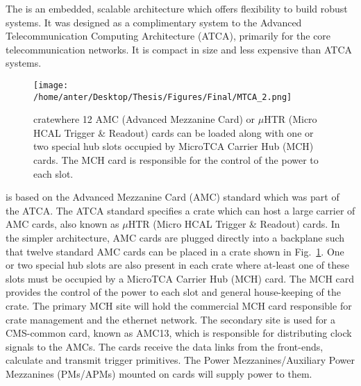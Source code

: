 The \mtca is an embedded, scalable architecture which offers flexibility to build robust systems. It was designed as a complimentary system to the Advanced Telecommunication Computing Architecture (ATCA), primarily for the core telecommunication networks. It is compact in size and less expensive than ATCA systems.\begin{figure}[!h]
\begin{center}
\vspace*{3mm}
\hspace*{-5mm}
\texttt{[image: /home/anter/Desktop/Thesis/Figures/Final/MTCA\_2.png]}\\
\vspace*{4mm}
\caption[\mtca crate showing the different slots.]{\mtca crate\footnotemark where 12 AMC (Advanced Mezzanine Card) or $\mu$HTR (Micro HCAL Trigger \& Readout) cards can be loaded along with one or two special hub slots occupied by MicroTCA Carrier Hub (MCH) cards. The MCH card is responsible for the control of the power to each slot.}
\label{fig:MTCA}
\end{center}
\end{figure} \mtca is based on the Advanced Mezzanine Card (AMC) standard which was part of the ATCA. The ATCA standard specifies a crate which can host a large carrier of AMC cards, also known as $\mu$HTR (Micro HCAL Trigger \& Readout) cards. In the simpler \mtca architecture, AMC cards are plugged directly into a backplane such that twelve standard AMC cards can be placed in a crate shown in Fig.~\ref{fig:MTCA}. One or two special hub slots are also present in each crate where at-least one of these slots must be occupied by a MicroTCA Carrier Hub (MCH) card. The MCH card provides the control of the power to each slot and general house-keeping of the crate. The primary MCH site will hold the commercial MCH card responsible for crate management and the ethernet network. The secondary site is used for a CMS-common card, known as AMC13, which is responsible for distributing clock signals to the AMCs. The \mhtr cards receive the data links from the front-ends, calculate and transmit trigger primitives. The Power Mezzanines/Auxiliary Power Mezzanines (PMs/APMs) mounted on \mhtr cards will supply power to them. 


